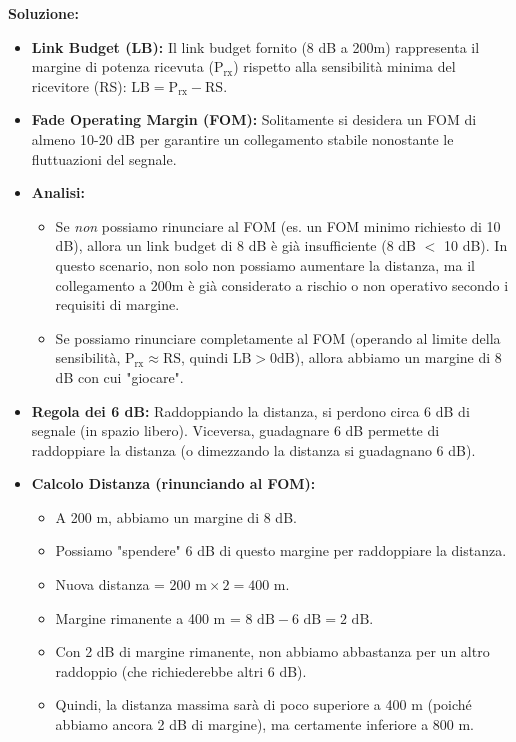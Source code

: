 \textbf{Soluzione:}
\begin{itemize}
    \item \textbf{Link Budget (LB):} Il link budget fornito (8 dB a 200m) rappresenta il margine di potenza ricevuta ($\text{P}_{\text{rx}}$) rispetto alla sensibilità minima del ricevitore (RS): $\text{LB} = \text{P}_{\text{rx}} - \text{RS}$.
    \item \textbf{Fade Operating Margin (FOM):} Solitamente si desidera un FOM di almeno 10-20 dB per garantire un collegamento stabile nonostante le fluttuazioni del segnale.
    \item \textbf{Analisi:}
    \begin{itemize}
        \item Se \textit{non} possiamo rinunciare al FOM (es. un FOM minimo richiesto di 10 dB), allora un link budget di 8 dB è già insufficiente (8 dB $<$ 10 dB). In questo scenario, non solo non possiamo aumentare la distanza, ma il collegamento a 200m è già considerato a rischio o non operativo secondo i requisiti di margine.
        \item Se possiamo rinunciare completamente al FOM (operando al limite della sensibilità, $\text{P}_{\text{rx}} \approx \text{RS}$, quindi $\text{LB} > 0\text{dB}$), allora abbiamo un margine di 8 dB con cui "giocare".
    \end{itemize}
    \item \textbf{Regola dei 6 dB:} Raddoppiando la distanza, si perdono circa 6 dB di segnale (in spazio libero). Viceversa, guadagnare 6 dB permette di raddoppiare la distanza (o dimezzando la distanza si guadagnano 6 dB).
    \item \textbf{Calcolo Distanza (rinunciando al FOM):}
    \begin{itemize}
        \item A 200 m, abbiamo un margine di 8 dB.
        \item Possiamo "spendere" 6 dB di questo margine per raddoppiare la distanza.
        \item Nuova distanza = $200 \text{ m} \times 2 = 400 \text{ m}$.
        \item Margine rimanente a 400 m = $8 \text{ dB} - 6 \text{ dB} = 2 \text{ dB}$.
        \item Con 2 dB di margine rimanente, non abbiamo abbastanza per un altro raddoppio (che richiederebbe altri 6 dB).
        \item Quindi, la distanza massima sarà di poco superiore a 400 m (poiché abbiamo ancora 2 dB di margine), ma certamente inferiore a 800 m.
    \end{itemize}
\end{itemize}

